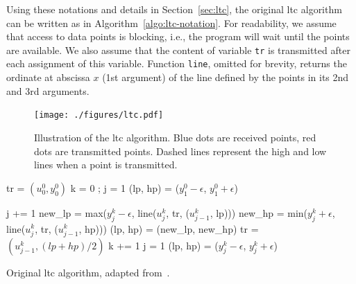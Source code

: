 Using these notations and details in Section~\ref{sec:ltc}, the original
\acrshort{ltc} algorithm can be written as in Algorithm~\ref{algo:ltc-notation}.
For readability, we assume that access to data points is blocking, i.e., the
program will wait until the points are available. We also assume that the
content of variable \texttt{tr} is transmitted after each assignment of this
variable. Function \texttt{line}, omitted for brevity, returns the ordinate at
abscissa $x$ (1st argument) of the line defined by the points in its 2nd and 3rd
arguments.

\begin{figure}[H]
\centering
\texttt{[image: ./figures/ltc.pdf]}
\caption{Illustration of the \acrshort{ltc} algorithm. Blue 
dots are received points, red dots are transmitted points. Dashed lines 
represent the high and low lines when a point is 
transmitted.\vspace*{-0.3cm}}
\label{fig:ltc-notation}
\end{figure}

\begin{algorithm}
\begin{algorithmic}[1]
\Input
\EndInput
\Output
\EndOutput
\State tr = $(u^0_0, y^0_0)$ 
\State k = 0 ; j = 1
\State (lp, hp) = ($y^0_1 - \epsilon$, $y^0_1 + \epsilon$) 

 
    \State j += 1
    \State new\_lp = max($y^k_j-\epsilon$, line($u^k_j$, tr, ($u^k_{j-1}$, lp)))
    \State new\_hp = min($y^k_j+\epsilon$, line($u^k_j$, tr, ($u^k_{j-1}$, hp)))
     
        \State (lp, hp) = (new\_lp, new\_hp)
    \Else
        \State tr = $(u^k_{j-1}, (lp+hp)/2)$
        \State k += 1
        \State j = 1
        \State (lp, hp) = ($y^k_j-\epsilon$, $y^k_j+\epsilon$)
    \EndIf
\EndWhile
\end{algorithmic}
\caption{Original \acrshort{ltc} algorithm, adapted from~\cite{schoellhammer2004lightweight}.}
\label{algo:ltc-notation}
\end{algorithm}


